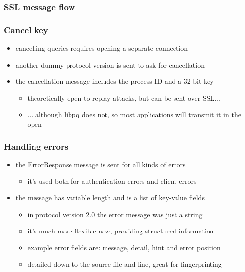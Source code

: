 \documentclass{beamer}
\begin{document}
\begin{frame}
  \frametitle{SSL message flow}


\end{frame}

\begin{frame}
  \frametitle{Cancel key}

  \begin{itemize}
  \item cancelling queries requires opening a separate connection
  \item another dummy protocol version is sent to ask for cancellation
  \item the cancellation message includes the process ID and a 32 bit key
    \begin{itemize}
    \item theoretically open to replay attacks, but can be sent over SSL...
    \item ... although libpq does not, so most applications will transmit it in
      the open
    \end{itemize}
  \end{itemize}


\end{frame}

\begin{frame}
  \frametitle{Handling errors}
  \begin{itemize}
  \item the ErrorResponse message is sent for all kinds of errors
    \begin{itemize}
    \item it's used both for authentication errors and client errors
    \end{itemize}
  \item the message has variable length and is a list of key-value fields
    \begin{itemize}
    \item in protocol version 2.0 the error message was just a string
    \item it's much more flexible now, providing structured information
    \item example error fields are: message, detail, hint and error position
    \item detailed down to the source file and line, great for fingerprinting
    \end{itemize}
  \end{itemize}


\end{frame}
\end{document}
